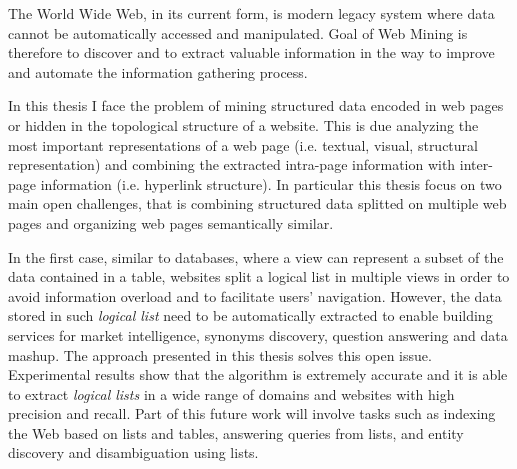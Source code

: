 
The World Wide Web, in its current form, is modern legacy system where data cannot be automatically accessed and manipulated. Goal of Web Mining is therefore to discover and to extract valuable information in the way to improve and automate the information gathering process. 

In this thesis I face the problem of mining structured data encoded in web pages or hidden in the topological structure of a website. 
 This is due analyzing the most important representations of a web page (i.e. textual, visual, structural representation) and combining the extracted intra-page information with inter-page information (i.e. hyperlink structure).  
In particular this thesis focus on two main open challenges, that is combining structured data splitted on multiple web pages and organizing web pages semantically similar.

In the first case,  similar to databases, where a view can represent a subset of the data contained in a table, websites split a logical list in multiple views in order to avoid information overload and to facilitate users' navigation. However, the data stored in such \emph{logical list} need to be automatically extracted to enable building services for market intelligence, synonyms discovery, question answering and data mashup. The approach presented in this thesis solves this open issue.
Experimental results show that the algorithm is extremely accurate and it is able to extract \textit{logical lists} in a wide range of domains and websites with high precision and recall.
Part of this future work will involve tasks such as indexing the Web based on lists and tables, answering queries from lists, and entity discovery and disambiguation using lists.

